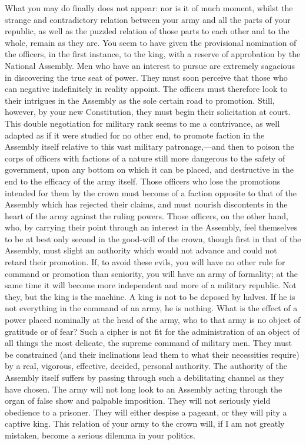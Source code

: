 What you may do finally does not appear: nor is it of much moment, whilst the strange and contradictory relation between your army and all the parts of your republic, as well as the puzzled relation of those parts to each other and to the whole, remain as they are. You seem to have given the provisional nomination of the officers, in the first instance, to the king, with a reserve of approbation by the National Assembly. Men who have an interest to pursue are extremely sagacious in discovering the true seat of power. They must soon perceive that those who can negative indefinitely in reality appoint. The officers must therefore look to their intrigues in the Assembly as the sole certain road to promotion. Still, however, by your new Constitution, they must begin their solicitation at court. This double negotiation for military rank seems to me a contrivance, as well adapted as if it were studied for no other end, to promote faction in the Assembly itself relative to this vast military patronage,—and then to poison the corps of officers with factions of a nature still more dangerous to the safety of government, upon any bottom on which it can be placed, and destructive in the end to the efficacy of the army itself. Those officers who lose the promotions intended for them by the crown must become of a faction opposite to that of the Assembly which has rejected their claims, and must nourish discontents in the heart of the army against the ruling powers. Those officers, on the other hand, who, by carrying their point through an interest in the Assembly, feel themselves to be at best only second in the good-will of the crown, though first in that of the Assembly, must slight an authority which would not advance and could not retard their promotion. If, to avoid these evils, you will have no other rule for command or promotion than seniority, you will have an army of formality; at the same time it will become more independent and more of a military republic. Not they, but the king is the machine. A king is not to be deposed by halves. If he is not everything in the command of an army, he is nothing. What is the effect of a power placed nominally at the head of the army, who to that army is no object of gratitude or of fear? Such a cipher is not fit for the administration of an object of all things the most delicate, the supreme command of military men. They must be constrained (and their inclinations lead them to what their necessities require) by a real, vigorous, effective, decided, personal authority. The authority of the Assembly itself suffers by passing through such a debilitating channel as they have chosen. The army will not long look to an Assembly acting through the organ of false show and palpable imposition. They will not seriously yield obedience to a prisoner. They will either despise a pageant, or they will pity a captive king. This relation of your army to the crown will, if I am not greatly mistaken, become a serious dilemma in your politics.

